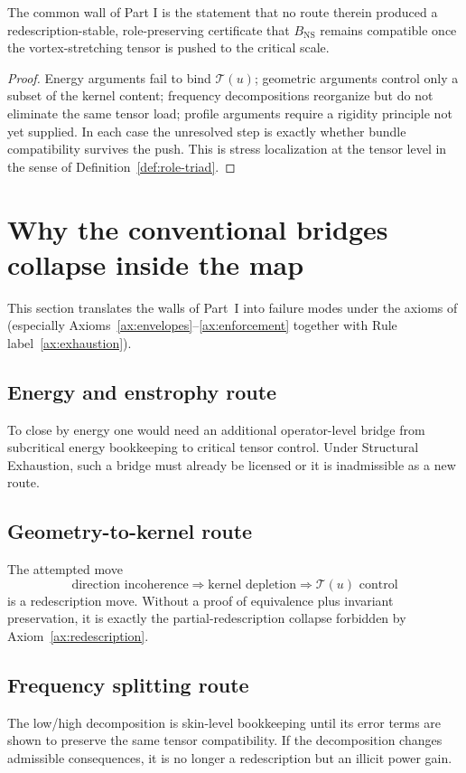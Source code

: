 \begin{proposition}\label{prop:wall-bundle}
The common wall of Part I is the statement that no route therein produced a redescription-stable,
role-preserving certificate that $B_{\mathrm{NS}}$ remains compatible once the vortex-stretching tensor is
pushed to the critical scale.
\end{proposition}

\begin{proof}
Energy arguments fail to bind $\mathcal T(u)$; geometric arguments control only a subset of the kernel
content; frequency decompositions reorganize but do not eliminate the same tensor load; profile
arguments require a rigidity principle not yet supplied. In each case the unresolved step is exactly
whether bundle compatibility survives the push. This is stress localization at the tensor level in the
sense of Definition~\ref{def:role-triad}.
\end{proof}

\section{Why the conventional bridges collapse inside the map}
This section translates the walls of Part~I into failure modes under the axioms of
 (especially Axioms~\ref{ax:envelopes}--\ref{ax:enforcement} together with Rule label~\ref{ax:exhaustion}).

\subsection{Energy and enstrophy route}
To close by energy one would need an additional operator-level bridge from subcritical energy
bookkeeping to critical tensor control. Under Structural Exhaustion, such a bridge must already be
licensed or it is inadmissible as a new route. 

\subsection{Geometry-to-kernel route}
The attempted move
\[
\text{direction incoherence} \Longrightarrow \text{kernel depletion} \Longrightarrow \mathcal T(u)
\text{ control}
\]
is a redescription move. Without a proof of equivalence plus invariant preservation, it is exactly the
partial-redescription collapse forbidden by Axiom~\ref{ax:redescription}.


\subsection{Frequency splitting route}
The low/high decomposition is skin-level bookkeeping until its error terms are shown to preserve the
same tensor compatibility. If the decomposition changes admissible consequences, it is no longer a
redescription but an illicit power gain. 

